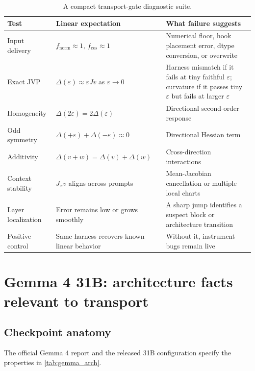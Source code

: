 \documentclass[11pt]{article}
\newcommand{\eps}{\varepsilon}
\theoremstyle{definition}
\theoremstyle{remark}
\begin{document}
\begin{table}[H]
\centering
\small
\caption{A compact transport-gate diagnostic suite.}
\label{tab:diagnostics}
\begin{tabularx}{\textwidth}{@{}p{}p{}X@{}}
\toprule
\textbf{Test} & \textbf{Linear expectation} & \textbf{What failure suggests}\\
\midrule
Input delivery & $f_{\mathrm{norm}}\approx1$, $f_{\mathrm{cos}}\approx1$ & Numerical floor, hook placement error, dtype conversion, or overwrite\\
Exact JVP & $\Delta(\eps)\approx\eps Jv$ as $\eps\to0$ & Harness mismatch if it fails at tiny faithful $\eps$; curvature if it passes tiny $\eps$ but fails at larger $\eps$\\
Homogeneity & $\Delta(2\eps)=2\Delta(\eps)$ & Directional second-order response\\
Odd symmetry & $\Delta(+\eps)+\Delta(-\eps)\approx0$ & Directional Hessian term\\
Additivity & $\Delta(v+w)=\Delta(v)+\Delta(w)$ & Cross-direction interactions\\
Context stability & $J_xv$ aligns across prompts & Mean-Jacobian cancellation or multiple local charts\\
Layer localization & Error remains low or grows smoothly & A sharp jump identifies a suspect block or architecture transition\\
Positive control & Same harness recovers known linear behavior & Without it, instrument bugs remain live\\
\bottomrule
\end{tabularx}
\end{table}

\section{Gemma 4 31B: architecture facts relevant to transport}

\subsection{Checkpoint anatomy}
The official Gemma 4 report and the released 31B configuration specify the properties in \cref{tab:gemma_arch}.
\end{document}
